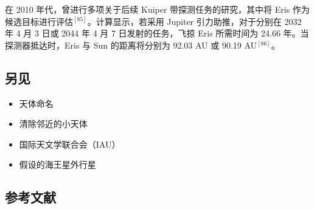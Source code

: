 在 2010 年代，曾进行多项关于后续 Kuiper 带探测任务的研究，其中将 Eris 作为候选目标进行评估\(^{[85]}\)。计算显示，若采用 Jupiter 引力助推，对于分别在 2032 年 4 月 3 日或 2044 年 4 月 7 日发射的任务，飞掠 Eris 所需时间为 24.66 年。当探测器抵达时，Eris 与 Sun 的距离将分别为 92.03 AU 或 90.19 AU\(^{[86]}\)。
\subsection{另见}
\begin{itemize}
\item 天体命名
\item 清除邻近的小天体
\item 国际天文学联合会（IAU）
\item 假设的海王星外行星
\end{itemize}
\subsection{参考文献}
